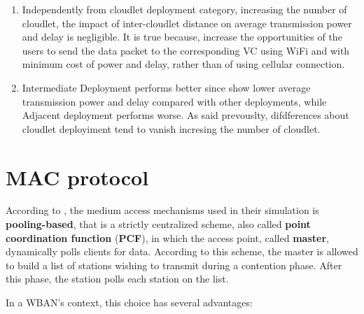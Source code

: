 \documentclass[sigchi]{acmart}
\begin{document}
\begin{enumerate}

\item Independently from cloudlet deployment category, increasing the number of cloudlet, the impact of inter-cloudlet distance on average transmission power and delay is negligible. It is true because, increase the opportunities of the users to send the data packet to the corresponding VC using WiFi and with minimum cost of power and delay, rather than of using cellular connection.

\item Intermediate Deployment performs better since show lower average transmission power and delay compared with other deployments, while Adjacent deployment performs worse. As said prevouslty, difdferences about cloudlet deployiment tend to vanish incresing the number of cloudlet.  

\end{enumerate}




















\section{MAC protocol}

According to \citet{MSAReport}, the medium access mechanisms used in their simulation is \textbf{pooling-based}, that is a strictly centralized scheme, also called \textbf{point coordination function} (\textbf{PCF}), in which the access point, called \textbf{master}, dynamically polls clients for data. According to this scheme, the master is allowed to build a list of stations wishing to transmit during a contention phase. After this phase, the station polls each station on the list.

In a WBAN's context, this choice has several advantages:
\end{document}
